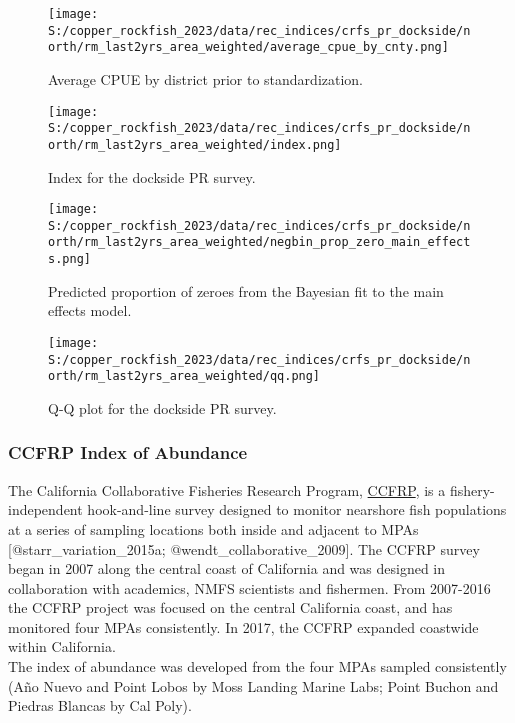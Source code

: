\documentclass[11pt,
  letterpaper,
]{article}
\begin{document}
\begin{figure}
{\centering
\texttt{[image: S:/copper\_rockfish\_2023/data/rec\_indices/crfs\_pr\_dockside/north/rm\_last2yrs\_area\_weighted/average\_cpue\_by\_cnty.png]}
}
\caption{Average CPUE by district prior to standardization.\label{fig:pr-districtcpue}}
\end{figure}

\newpage

\begin{figure}
{\centering
\texttt{[image: S:/copper\_rockfish\_2023/data/rec\_indices/crfs\_pr\_dockside/north/rm\_last2yrs\_area\_weighted/index.png]}
}
\caption{Index for the dockside PR survey.\label{fig:pr-index}}
\end{figure}

\newpage

\begin{figure}
{\centering
\texttt{[image: S:/copper\_rockfish\_2023/data/rec\_indices/crfs\_pr\_dockside/north/rm\_last2yrs\_area\_weighted/negbin\_prop\_zero\_main\_effects.png]}
}
\caption{Predicted proportion of zeroes from the Bayesian fit to the main effects model.\label{fig:pr-prop-zero}}
\end{figure}

\newpage

\begin{figure}
{\centering
\texttt{[image: S:/copper\_rockfish\_2023/data/rec\_indices/crfs\_pr\_dockside/north/rm\_last2yrs\_area\_weighted/qq.png]}
}
\caption{Q-Q plot for the dockside PR survey.\label{fig:pr-qq}}
\end{figure}

\newpage

\subsubsection{CCFRP Index of Abundance}\label{ccfrp-index}

The California Collaborative Fisheries Research Program, \href{https://www.mlml.calstate.edu/ccfrp/}{CCFRP}, is a fishery-independent hook-and-line survey designed to monitor nearshore fish populations at a series of sampling locations both inside and adjacent to MPAs {[}@starr\_variation\_2015a; @wendt\_collaborative\_2009{]}. The CCFRP survey began in 2007 along the central coast of California and was designed in collaboration with academics, NMFS scientists and fishermen. From 2007-2016 the CCFRP project was focused on the central California coast, and has monitored four MPAs consistently. In 2017, the CCFRP expanded coastwide within California.\\
The index of abundance was developed from the four MPAs sampled consistently (Año Nuevo and Point Lobos by Moss Landing Marine Labs; Point Buchon and Piedras Blancas by Cal Poly).
\end{document}
